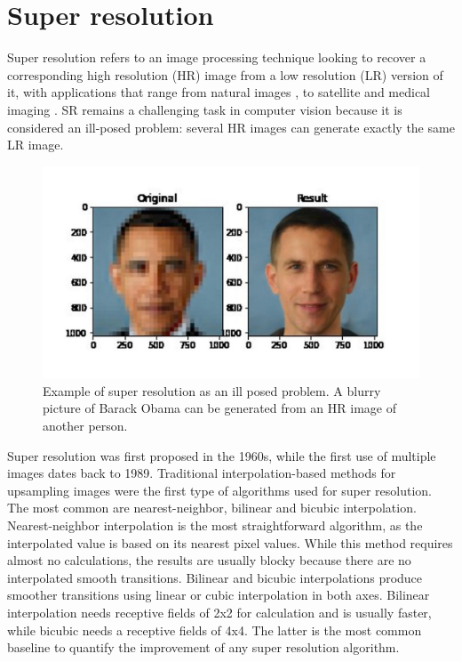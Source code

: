 \section{Super resolution} \label{sec:SR}

    Super resolution refers to an image processing technique looking to recover a corresponding high resolution (HR) image from a low resolution (LR) version of it, with applications that range from natural images \cite{zeyde2010single}, \cite{martin2001database} to satellite \cite{valsesia2021permutation} and medical imaging \cite{bashir2021comprehensive}. SR remains a challenging task in computer vision because it is considered an ill-posed problem: several HR images can generate exactly the same LR image. 

       \begin{figure}[H]
            \centering
            \includegraphics[width=\textwidth]{Includes/2-SR-ill-posed.jpg}
            \caption{Example of super resolution as an ill posed problem. A blurry picture of Barack Obama can be generated from an HR image of another person.}
            \label{fig:2-SR-ill-posed}
        \end{figure}
    
    Super resolution was first proposed in the 1960s, while the first use of multiple images dates back to 1989. 
    Traditional interpolation-based methods for upsampling images were the first type of algorithms used for super resolution.
    The most common are nearest-neighbor, bilinear and bicubic interpolation.
    Nearest-neighbor interpolation is the most straightforward algorithm, as the interpolated value is based on its nearest pixel values. 
    While this method requires almost no calculations, the results are usually blocky because there are no interpolated smooth transitions.
    Bilinear and bicubic interpolations produce smoother transitions using linear or cubic interpolation in both axes. 
    Bilinear interpolation needs receptive fields of 2x2 for calculation and is usually faster, while bicubic needs a receptive fields of 4x4. 
    The latter is the most common baseline to quantify the improvement of any super resolution algorithm. 

